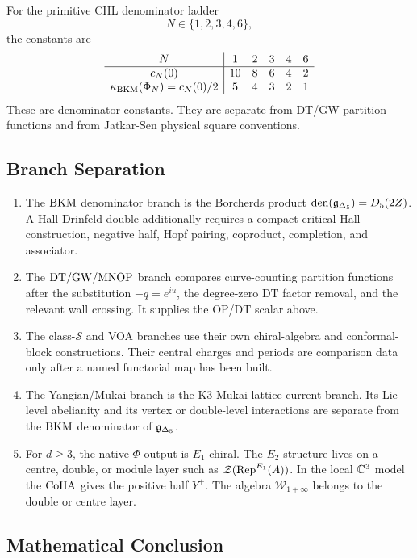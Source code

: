 For the primitive CHL denominator ladder
\[
        N\in\{1,2,3,4,6\},
\]
the constants are
\[
\begin{array}{c|ccccc}
N & 1&2&3&4&6\\
\hline
c_N(0) & 10&8&6&4&2\\
\kappa_{\mathrm{BKM}}(\Phi_N)=c_N(0)/2 & 5&4&3&2&1
\end{array}
\]
These are denominator constants.  They are separate from DT/GW
partition functions and from Jatkar-Sen physical square conventions.

\subsection*{Branch Separation}

\begin{enumerate}
\item The \(\mathrm{BKM}\) denominator branch is the Borcherds product
\(\operatorname{den}(\mathfrak{g}_{\Delta_5})=D_5(2Z)\).  A Hall-Drinfeld
double additionally requires a compact critical Hall construction,
negative half, Hopf pairing, coproduct, completion, and associator.
\item The \(\mathrm{DT}/\mathrm{GW}/\mathrm{MNOP}\) branch compares curve-counting partition
functions after the substitution \(-q=e^{iu}\), the degree-zero DT
factor removal, and the relevant wall crossing.  It supplies the
OP/DT scalar above.
\item The class-\(\mathcal S\) and VOA branches use their own
chiral-algebra and conformal-block constructions.  Their central
charges and periods are comparison data only after a named functorial
map has been built.
\item The Yangian/Mukai branch is the K3 Mukai-lattice current branch.
Its Lie-level abelianity and its vertex or double-level interactions
are separate from the \(\mathrm{BKM}\) denominator of \(\mathfrak{g}_{\Delta_5}\).
\item For \(d\geq3\), the native \(\Phi\)-output is \(E_1\)-chiral.
The \(E_2\)-structure lives on a centre, double, or module layer such
as \(\mathcal{Z}(\operatorname{Rep}^{E_1}(A))\).  In the local
\(\mathbb{C}^3\) model the \(\mathrm{CoHA}\) gives the positive half \(Y^+\).
The algebra \(\mathcal W_{1+\infty}\) belongs to the double or centre
layer.
\end{enumerate}

\subsection*{Mathematical Conclusion}

